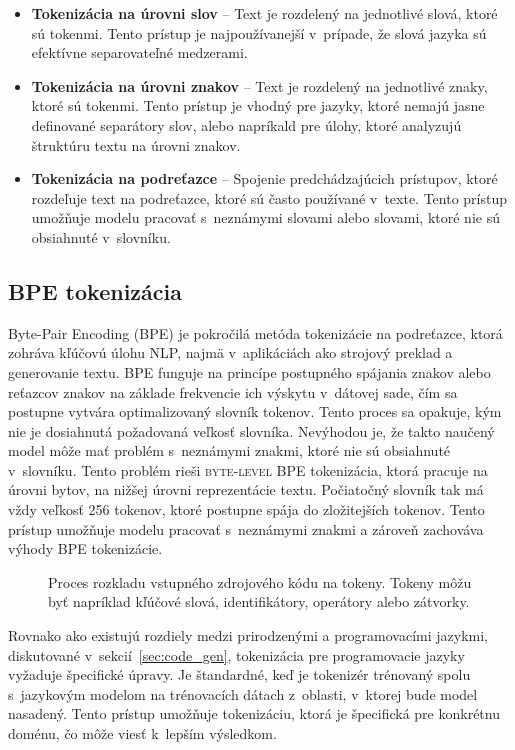 \begin{itemize}
    \item \textbf{Tokenizácia na úrovni slov} -- Text je rozdelený na jednotlivé slová, ktoré sú tokenmi. Tento prístup je najpoužívanejší v~prípade, že slová jazyka sú efektívne separovateľné medzerami. 
    \item \textbf{Tokenizácia na úrovni znakov} -- Text je rozdelený na jednotlivé znaky, ktoré sú tokenmi. Tento prístup je vhodný pre jazyky, ktoré nemajú jasne definované separátory slov, alebo napríkald pre úlohy, ktoré analyzujú štruktúru textu na úrovni znakov.
    \item \textbf{Tokenizácia na podreťazce} -- Spojenie predchádzajúcich prístupov, ktoré rozdeľuje text na podreťazce, ktoré sú často používané v~texte. Tento prístup umožňuje modelu pracovať s~neznámymi slovami alebo slovami, ktoré nie sú obsiahnuté v~slovníku.
\end{itemize}

\subsection{BPE tokenizácia}

Byte-Pair Encoding (BPE) je pokročilá metóda tokenizácie na podreťazce, ktorá zohráva kľúčovú úlohu NLP, najmä v~aplikáciách ako strojový preklad a generovanie textu. BPE funguje na princípe postupného spájania znakov alebo reťazcov znakov na základe frekvencie ich výskytu v~dátovej sade, čím sa postupne vytvára optimalizovaný slovník tokenov. Tento proces sa opakuje, kým nie je dosiahnutá požadovaná veľkosť slovníka. Nevýhodou je, že takto naučený model môže mať problém s~neznámymi znakmi, ktoré nie sú obsiahnuté v~slovníku. Tento problém rieši \textsc{byte-level BPE} tokenizácia, ktorá pracuje na úrovni bytov, na nižšej úrovni reprezentácie textu. Počiatočný slovník tak má vždy veľkosť 256 tokenov, ktoré postupne spája do zložitejších tokenov. Tento prístup umožňuje modelu pracovať s~neznámymi znakmi a zároveň zachováva výhody BPE tokenizácie.

\begin{figure}
    \centering
    
    \caption{Proces rozkladu vstupného zdrojového kódu na tokeny. Tokeny môžu byť napríklad kľúčové slová, identifikátory, operátory alebo zátvorky.}
    \label{fig:tokenization}
\end{figure}

Rovnako ako existujú rozdiely medzi prirodzenými a programovacími jazykmi, diskutované v~sekcií~\ref{sec:code_gen}, tokenizácia pre programovacie jazyky vyžaduje špecifické úpravy. Je štandardné, keď je tokenizér trénovaný spolu s~jazykovým modelom na trénovacích dátach z~oblasti, v~ktorej bude model nasadený. Tento prístup umožňuje tokenizáciu, ktorá je špecifická pre konkrétnu doménu, čo môže viesť k~lepším výsledkom. 

